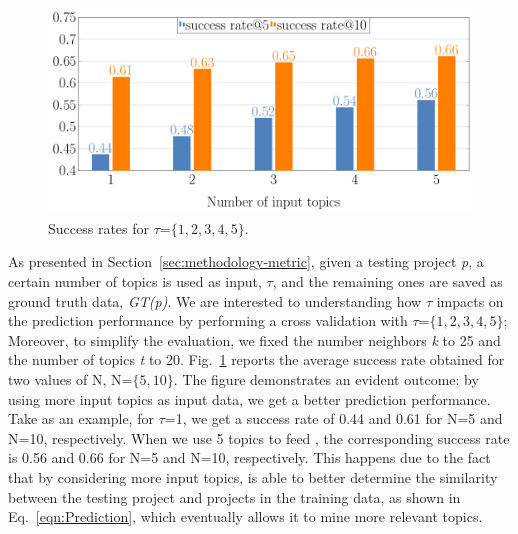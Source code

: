 \begin{figure}[h!]
	\centering
	\includegraphics[width=0.90\linewidth]{figs/successRate_inputTopic.pdf}
	\caption{Success rates for $\tau$=$\{1,2,3,4,5\}$.}
	\label{fig:pr-input-topics}
\end{figure} 

As presented in Section~\ref{sec:methodology-metric}, given a testing project \emph{p}, a certain number of topics is used as input, \ie $\tau$, and the remaining ones are saved as ground truth data, \ie \emph{GT(p)}. We are interested to understanding how $\tau$ impacts on the prediction performance by performing a cross validation with $\tau$=$\{1,2,3,4,5\}$; Moreover, to simplify the evaluation, we fixed the number neighbors \emph{k} to 25 and the number of topics \emph{t} to 20. Fig.~\ref{fig:pr-input-topics} reports the average success rate obtained for two values of N, \ie N=$\{5,10\}$. %
The figure demonstrates an evident outcome: by using more input topics as input data, we get a better prediction performance. Take as an example, for $\tau$=1, we get a success rate of 0.44 and 0.61 for N=5 and N=10, respectively. When we use 5 topics to feed \TFa, the corresponding success rate is 0.56 and 0.66 for N=5 and N=10, respectively. This happens due to the fact that by considering more input topics, \TFa is able to better determine the similarity between the testing project and projects in the training data, as shown in Eq.~\ref{eqn:Prediction}, which eventually allows it to mine more relevant topics.







